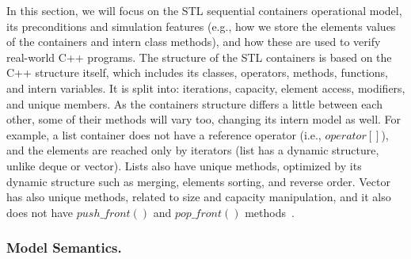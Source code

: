 \documentclass[a4paper]{llncs}
\newcommand{\comment}[1]{}
\begin{document}
In this section, we will focus on the STL sequential
containers operational model, its preconditions and
simulation features (e.g., how we store the elements
values of the containers and intern class methods),
and how these are used to verify real-world C++ programs.
The structure of the STL containers is based on the
C++ structure itself, which includes its classes, operators,
methods, functions, and intern variables. It is split into:
iterations, capacity, element access, modifiers, and unique
members. As the containers structure differs a little
between each other, some of their methods will vary too,
changing its intern model as well. For example, a list container
does not have a reference operator (i.e., $operator\left[\right]$), and the elements
are reached only by iterators (list has a dynamic structure,
unlike deque or vector). Lists also have unique methods, optimized by its
dynamic structure such as merging, elements sorting, and reverse order.
Vector has also unique methods, related to size and capacity manipulation,
and it also does not have $push\_front\left(\right)$
and $pop\_front\left(\right)$ methods~\cite{CppReference12}.

\subsubsection{Model Semantics.}

\comment{
Let us consider that a container model is composed
by five types of variables, which are: $I$, $C$,
$N$, $P$ and $T$. Let $I$ be an iterator that points
to a position in the container; $C$ be a container itself;
$N$ be a natural integer number used in the container
such as size, capacity and elements index; $P$ be
the memory address where $T$ is located; and $T$ be the
values stored in the container.
For convention, we assume that
$\left(c, v, d, l\right) \subset C, \{i, j, n\}
\subset N$ and $\{it1, it2\} \subset I$.}
\end{document}
